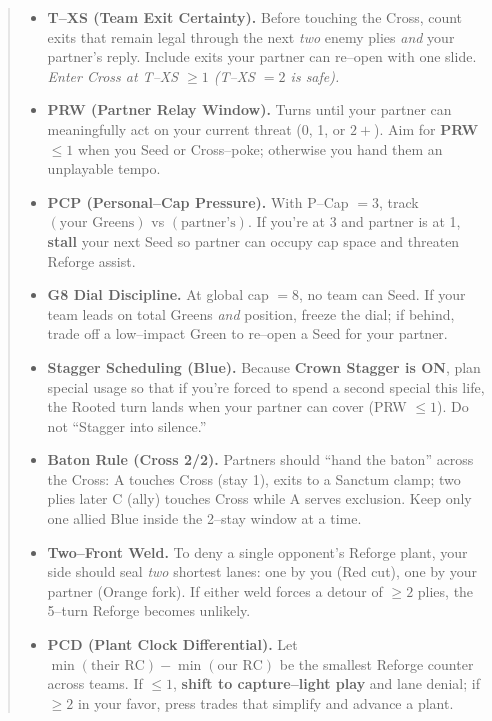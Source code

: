 \documentclass[11pt]{article}
\begin{document}
\begin{quote}
\begin{itemize}[leftmargin=1.3em,itemsep=0.3em]
  \item \textbf{T–XS (Team Exit Certainty).}
  Before touching the Cross, count exits that remain legal through the next \emph{two} enemy plies \emph{and} your partner’s reply. Include exits your partner can re–open with one slide. \emph{Enter Cross at T–XS $\ge 1$ (T–XS $=2$ is safe).}

  \item \textbf{PRW (Partner Relay Window).}
  Turns until your partner can meaningfully act on your current threat (0, 1, or $2+$). Aim for \textbf{PRW $\le 1$} when you Seed or Cross–poke; otherwise you hand them an unplayable tempo.

  \item \textbf{PCP (Personal–Cap Pressure).}
  With P–Cap $=3$, track $(\text{your Greens})$ vs $(\text{partner’s})$. If you’re at 3 and partner is at 1, \textbf{stall} your next Seed so partner can occupy cap space and threaten Reforge assist.

  \item \textbf{G8 Dial Discipline.}
  At global cap $=8$, no team can Seed. If your team leads on total Greens \emph{and} position, freeze the dial; if behind, trade off a low–impact Green to re–open a Seed for your partner.

  \item \textbf{Stagger Scheduling (Blue).}
  Because \textbf{Crown Stagger is ON}, plan special usage so that if you’re forced to spend a second special this life, the Rooted turn lands when your partner can cover (PRW $\le 1$). Do not “Stagger into silence.”

  \item \textbf{Baton Rule (Cross 2/2).}
  Partners should “hand the baton” across the Cross: A touches Cross (stay 1), exits to a Sanctum clamp; two plies later C (ally) touches Cross while A serves exclusion. Keep only one allied Blue inside the 2–stay window at a time.

  \item \textbf{Two–Front Weld.}
  To deny a single opponent’s Reforge plant, your side should seal \emph{two} shortest lanes: one by you (Red cut), one by your partner (Orange fork). If either weld forces a detour of $\ge 2$ plies, the 5–turn Reforge becomes unlikely.

  \item \textbf{PCD (Plant Clock Differential).}
  Let $\min(\text{their RC}) - \min(\text{our RC})$ be the smallest Reforge counter across teams. If $\le 1$, \textbf{shift to capture–light play} and lane denial; if $\ge 2$ in your favor, press trades that simplify and advance a plant.


\end{itemize}
\end{quote}
\end{document}
